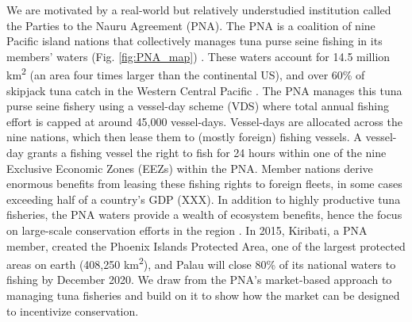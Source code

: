 \documentclass[12pt]{article}
\begin{document}
We are motivated by a real-world but relatively understudied institution called the Parties to the Nauru Agreement (PNA). The PNA is a coalition of nine Pacific island nations that collectively manages tuna purse seine fishing in its members' waters (Fig. \ref{fig:PNA_map}) \cite{havice_2013,aqorau_2018}. These waters account for 14.5 million km\textsuperscript{2} (an area four times larger than the continental US), and over 60\% of skipjack tuna catch in the Western Central Pacific \cite{havice_2013}. The PNA manages this tuna purse seine fishery using a vessel-day scheme (VDS) where total annual fishing effort is capped at around 45,000 vessel-days. Vessel-days are allocated across the nine nations, which then lease them to (mostly foreign) fishing vessels. A vessel-day grants a fishing vessel the right to fish for 24 hours within one of the nine Exclusive Economic Zones (EEZs) within the PNA. Member nations derive enormous benefits from leasing these fishing rights to foreign fleets, in some cases exceeding half of a country's GDP (XXX). In addition to highly productive tuna fisheries, the PNA waters provide a wealth of ecosystem benefits, hence the focus on large-scale conservation efforts in the region \cite{mcleod_2019}. In 2015, Kiribati, a PNA member, created the Phoenix Islands Protected Area, one of the largest protected areas on earth (408,250 km\textsuperscript{2}), and Palau will close 80\% of its national waters to fishing by December 2020. We draw from the PNA's market-based approach to managing tuna fisheries and build on it to show how the market can be designed to incentivize conservation.
\end{document}
